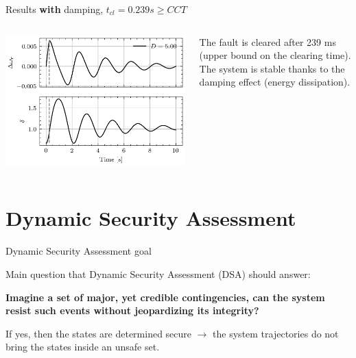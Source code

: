 \begin{frame}{Results \textbf{with} damping, $t_{cl} = 0.239 s \geq CCT$}
\begin{columns}
    \begin{column}{0.55\textwidth}
        \begin{center}
        \includegraphics[width=0.9\linewidth]{images/P-dynamics_bis_failed.png}
        \end{center}
    \end{column}
    \begin{column}{0.45\textwidth}
        The fault is cleared after 239 ms (upper bound on the clearing time). The system is stable thanks to the damping effect (energy dissipation).
    \end{column}
\end{columns}
\end{frame}

\section{{Dynamic Security Assessment}}
\begin{frame}{Dynamic Security Assessment goal}

    Main question that Dynamic Security Assessment (DSA) should answer:

\textbf{Imagine a set of major, yet credible contingencies, can the system resist such events without jeopardizing its integrity?}

If yes, then the states are determined secure $\rightarrow$ the system trajectories do not bring the states inside an unsafe set.
\end{frame}

